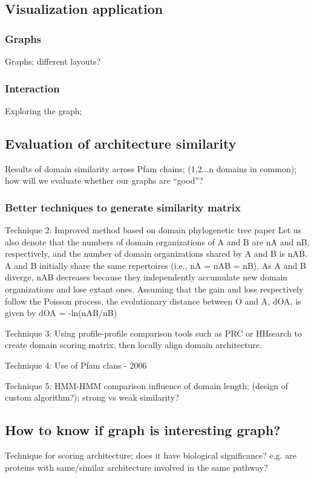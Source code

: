 \subsection{Visualization application}

\subsubsection{Graphs}
Graphs; different layouts? 

\subsubsection{Interaction}
Exploring the graph;


\subsection{Evaluation of architecture similarity}
Results of domain similarity across Pfam chains; (1,2...n domains in common); how will we evaluate whether our graphs are ``good''?


\subsubsection{Better techniques to generate similarity matrix}
Technique 2: Improved method based on domain phylogenetic tree paper
Let us also denote that the numbers of domain organizations of A and B are nA and nB, respectively, and the number of domain organizations shared by A and B is nAB. A and B initially share the same repertoires (i.e., nA = nAB = nB). As A and B diverge, nAB decreases because they independently accumulate new domain organizations and lose extant ones. Assuming that the gain and loss respectively follow the Poisson process, the evolutionary distance between O and A, dOA, is given by  dOA = -ln(nAB/nB)

Technique 3: Using profile-profile comparison tools such as PRC or HHsearch to create domain scoring matrix, then locally align domain architecture.

Technique 4: Use of Pfam clans - 2006

Technique 5: HMM-HMM comparison
influence of domain length; (design of custom algorithm?); strong vs weak similarity?

\subsection{How to know if graph is interesting graph?}
Technique for scoring architecture; does it have biological significance? e.g. are proteins with same/similar architecture involved in the same pathway?


